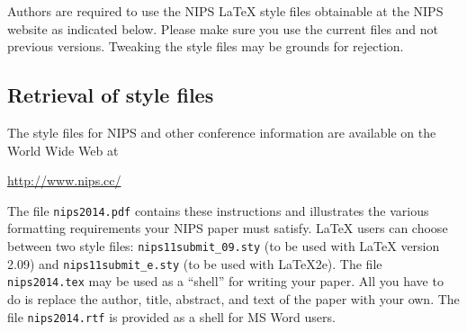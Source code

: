 \documentclass{article} %
\begin{document}
	Authors are required to use the NIPS \LaTeX{} style files obtainable at the
	NIPS website as indicated below. Please make sure you use the current files and
	not previous versions. Tweaking the style files may be grounds for rejection.
	
	
	
	
	
	
	
	
	\subsection{Retrieval of style files}
	
	The style files for NIPS and other conference information are available on the World Wide Web at
	\begin{center}
		\url{http://www.nips.cc/}
	\end{center}
	The file \verb+nips2014.pdf+ contains these 
	instructions and illustrates the
	various formatting requirements your NIPS paper must satisfy. \LaTeX{}
	users can choose between two style files:
	\verb+nips11submit_09.sty+ (to be used with \LaTeX{} version 2.09) and
	\verb+nips11submit_e.sty+ (to be used with \LaTeX{}2e). The file
	\verb+nips2014.tex+ may be used as a ``shell'' for writing your paper. All you
	have to do is replace the author, title, abstract, and text of the paper with
	your own. The file
	\verb+nips2014.rtf+ is provided as a shell for MS Word users.
	
\end{document}
